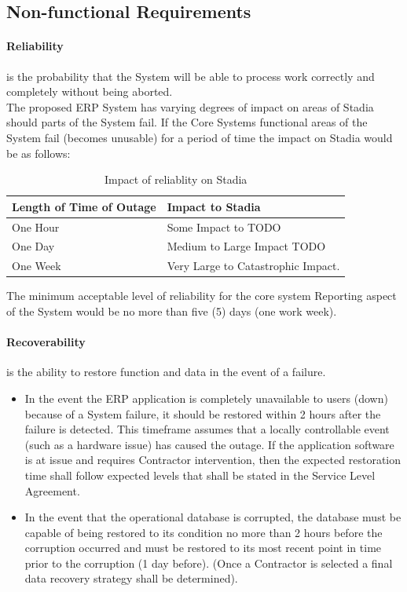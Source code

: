 \subsection{Non-functional Requirements}

\paragraph{Reliability}
is the probability that the System will be able to process work correctly and completely without being aborted.
\\
The proposed ERP System has varying degrees of impact on areas of Stadia should parts of the System fail.
If the Core Systems functional areas of the System fail (becomes unusable) for a period of time the impact on Stadia would be as follows:

\begin{center}
\begin{table}[!hb]
\begin{tabular}{ | m{10em} | m{25em}| } 
  \hline
  \textbf{Length of Time of Outage} & \textbf{Impact to Stadia} \\ 
  \hline
   One Hour & Some Impact to {{TODO}} \\ 
   \hline
   One Day & Medium to Large Impact {{TODO}} \\
   \hline
   One Week & Very Large to Catastrophic Impact. \\
  \hline
\end{tabular}
\caption{Impact of reliablity on Stadia}
\end{table}
\end{center}

The minimum acceptable level of reliability for the core system Reporting aspect of the System would be no more than five (5) days (one work week).

\paragraph{Recoverability}
is the ability to restore function and data in the event of a failure.

\begin{itemize}
	\item In the event the ERP application is completely unavailable to users (down) because of a System failure, it should be restored within 2 hours after the failure is detected.  This timeframe assumes that a locally controllable event (such as a hardware issue) has caused the outage.  If the application software is at issue and requires Contractor intervention, then the expected restoration time shall follow expected levels that shall be stated in the Service Level Agreement. 
	\item In the event that the operational database is corrupted, the database must be capable of being restored to its condition no more than 2 hours before the corruption occurred and must be restored to its most recent point in time prior to the corruption (1 day before). (Once a Contractor is selected a final data recovery strategy shall be determined).
\end{itemize}

